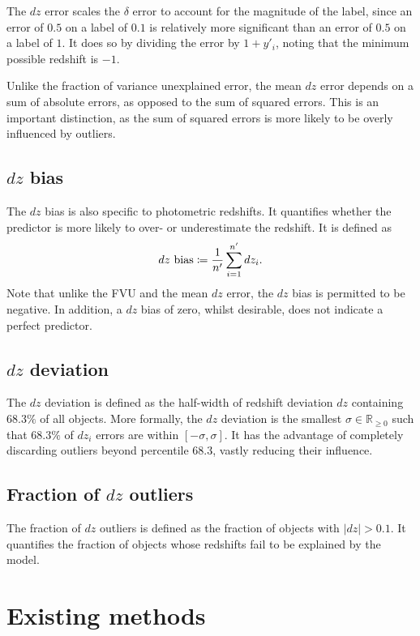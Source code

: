 \documentclass[11pt,twoside,openright]{report}
\newcommand\bbR{\mathbb{R}}
\newcommand\abs[1]{\left|#1\right|}
\begin{document}
The $dz$ error scales the $\delta$ error to account for the magnitude of the label, since an error of $0.5$ on a label of $0.1$ is relatively more significant than an error of $0.5$ on a label of $1$. It does so by dividing the error by $1 + y'_i$, noting that the minimum possible redshift is $-1$.

Unlike the fraction of variance unexplained error, the mean $dz$ error depends on a sum of absolute errors, as opposed to the sum of squared errors. This is an important distinction, as the sum of squared errors is more likely to be overly influenced by outliers.

\subsection{$dz$ bias}

The $dz$ bias is also specific to photometric redshifts. It quantifies whether the predictor is more likely to over- or underestimate the redshift. It is defined as\[
  \textrm{$dz$ bias} \coloneqq \frac{1}{n'}\sum_{i=1}^{n'} dz_i \text.
\] Note that unlike the FVU and the mean $dz$ error, the $dz$ bias is permitted to be negative. In addition, a $dz$ bias of zero, whilst desirable, does not indicate a perfect predictor.

\subsection{$dz$ deviation}

The $dz$ deviation is defined as the half-width of redshift deviation $dz$ containing $68.3\%$ of all objects. More formally, the $dz$ deviation is the smallest $\sigma \in \bbR_{\geq0}$ such that $68.3\%$ of $dz_i$ errors are within $[-\sigma, \sigma]$. It has the advantage of completely discarding outliers beyond percentile $68.3$, vastly reducing their influence.

\subsection{Fraction of $dz$ outliers}

The fraction of $dz$ outliers is defined as the fraction of objects with $\abs{dz} > 0.1$. It quantifies the fraction of objects whose redshifts fail to be explained by the model.

\section{Existing methods}
\end{document}
